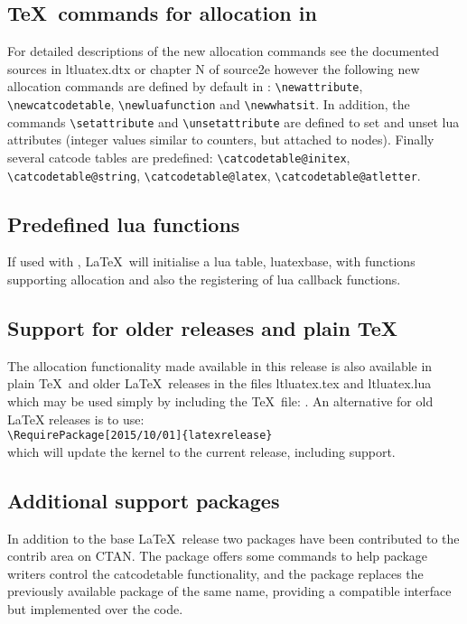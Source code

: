 \documentclass{ltnews}
\begin{document}
\subsection{\TeX\ commands for allocation in }
For detailed descriptions of the new allocation commands see the
documented sources in \textsf{ltluatex.dtx} or chapter N of
\textsf{source2e} however the following new allocation commands are
defined by default in : 
\verb|\newattribute|,
\verb|\newcatcodetable|,
\verb|\newluafunction| and
\verb|\newwhatsit|.
In addition, the commands \verb|\setattribute| and
\verb|\unsetattribute| are defined to set and unset lua attributes
(integer values similar to counters, but attached to nodes). Finally
several catcode tables are predefined: 
\verb|\catcodetable@initex|,
\verb|\catcodetable@string|,
\verb|\catcodetable@latex|,
\verb|\catcodetable@atletter|.

\subsection{Predefined lua functions}
If used with , \LaTeX\ will initialise a lua table,
\textsf{luatexbase}, with functions supporting allocation and also
the registering of lua callback functions.

\subsection{Support for older releases and plain \TeX}
The  allocation functionality made available in this
release is also available in plain \TeX\ and older \LaTeX\ releases 
in the files \textsf{ltluatex.tex} and \textsf{ltluatex.lua} which may be
used simply by including the \TeX\ file: \verb||.
An alternative for old LaTeX releases is to use:\\
\verb|\RequirePackage[2015/10/01]{latexrelease}|\\
which will update the kernel to the current release, including
 support.

\subsection{Additional  support packages}
In addition to the base \LaTeX\ release two packages have been
contributed to the \textsf{contrib} area on CTAN. The
 package offers some commands to help package
writers control the  \textsf{catcodetable}
functionality, and the  package replaces the
previously available package of the same name, providing a compatible
interface but implemented over the  code.
\end{document}
